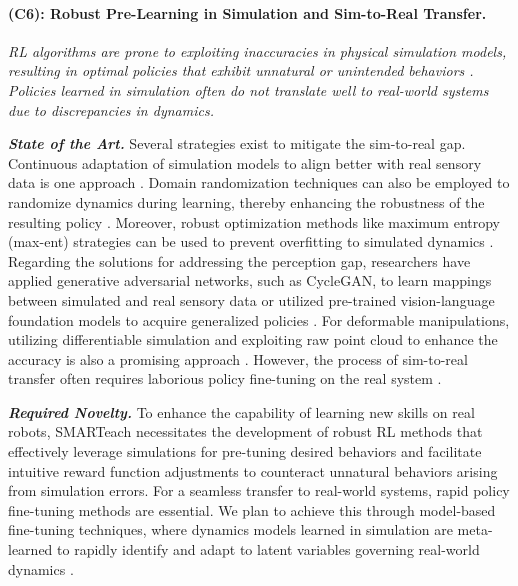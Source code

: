 \documentclass{erc-B2}
\begin{document}
\paragraph{(C6): Robust Pre-Learning in Simulation and  Sim-to-Real Transfer.}
\textit{RL algorithms are prone to exploiting inaccuracies in physical simulation models, resulting in optimal policies that exhibit unnatural or unintended behaviors \cite{zhao2020sim2real}. Policies learned in simulation often do not translate well to real-world systems due to discrepancies in dynamics.}

\textit{\textbf{State of the Art.}} Several strategies exist to mitigate the sim-to-real gap. Continuous adaptation of simulation models to align better with real sensory data is one approach \cite{clavera2018learning, linkerhagnerFSM23}. Domain randomization techniques can also be employed to randomize dynamics during learning, thereby enhancing the robustness of the resulting policy \cite{tobin2017domain}. Moreover, robust optimization methods like maximum entropy (max-ent) strategies can be used to prevent overfitting to simulated dynamics \cite{anonymous2023domain}. Regarding the solutions for addressing the perception gap, researchers have applied generative adversarial networks, such as CycleGAN, to learn mappings between simulated and real sensory data \cite{Rao_2020_CVPR} or utilized pre-trained vision-language foundation models to acquire generalized policies  \cite{ge2023policy}. For deformable manipulations, utilizing differentiable simulation and exploiting raw point cloud to enhance the accuracy is also a promising approach \cite{sundaresan2022diffcloud}. However, the process of sim-to-real transfer often requires laborious policy fine-tuning on the real system \cite{zhao2020sim2real}.

\textit{\textbf{Required Novelty.}} To enhance the capability of learning new skills on real robots, SMARTeach necessitates the development of robust RL methods that effectively leverage simulations for pre-tuning desired behaviors and facilitate intuitive reward function adjustments to counteract unnatural behaviors arising from simulation errors. For a seamless transfer to real-world systems, rapid policy fine-tuning methods are essential. We plan to achieve this through model-based fine-tuning techniques, where dynamics models learned in simulation are meta-learned to rapidly identify and adapt to latent variables governing real-world dynamics \cite{kumar2021rma}.
\end{document}
